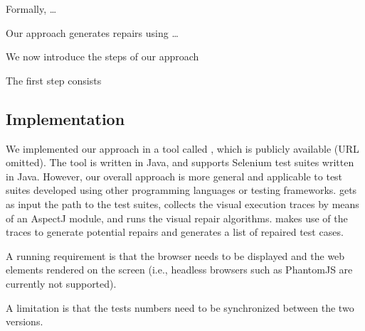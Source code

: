 Formally, \ldots 

Our approach generates repairs using \ldots

We now introduce the steps of our approach


The first step consists




\subsection{Implementation}\label{sec:implementation}

We implemented our approach in a tool called \tool, which is publicly available (URL omitted). 
The tool is written in Java, and supports Selenium test suites written in Java. However, our overall approach is more general and applicable to test suites developed using other programming languages or testing frameworks. 
\tool gets as input the path to the test suites, collects the visual execution traces by means of an AspectJ module, and runs the visual repair algorithms. 
\tool makes use of the traces to generate potential repairs and generates a list of repaired test cases.


A running requirement is that the browser needs to be displayed and the web elements rendered on the screen (i.e., headless browsers such as PhantomJS are currently not supported).

A limitation is that the tests numbers need to be synchronized between the two versions. 







